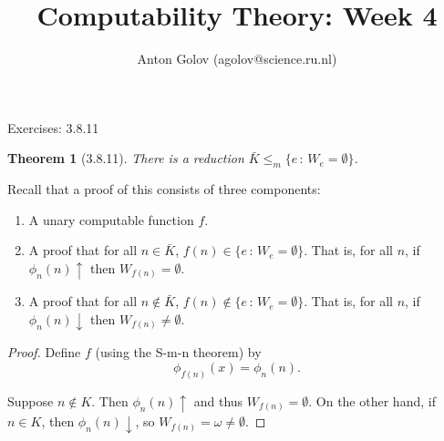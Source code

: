 \documentclass{article}
\title{Computability Theory: Week 4}
\author{Anton Golov (agolov@science.ru.nl)}
\newtheorem{theorem}{Theorem}
\newcommand{\compr}[2]{\{ #1 \,:\, #2 \}}
\newcommand{\terminates}{\!\!\downarrow}
\newcommand{\diverges}{\!\!\uparrow}
\begin{document}
  \maketitle

  Exercises: 3.8.11

  \begin{theorem}[3.8.11]
    There is a reduction $\bar K \le_m \compr{e}{W_e = \emptyset}$.
  \end{theorem}

  Recall that a proof of this consists of three components:
  \begin{enumerate}
    \item A unary computable function $f$.
    \item A proof that for all $n \in \bar K$, $f(n) \in \compr{e}{W_e = \emptyset}$.  That is, for all $n$, if
    $\phi_n(n)\diverges$ then $W_{f(n)} = \emptyset$.
    \item A proof that for all $n \not \in \bar K$, $f(n) \not \in \compr{e}{W_e = \emptyset}$.  That is, for all $n$,
      if $\phi_n(n)\terminates$ then $W_{f(n)} \neq \emptyset$.
  \end{enumerate}

  \begin{proof}
    Define $f$ (using the S-m-n theorem) by
    \[
      \phi_{f(n)}(x) = \phi_n(n).
    \]

    Suppose $n \not \in K$.  Then $\phi_n(n)\diverges$ and thus $W_{f(n)} = \emptyset$.  On the other hand, if $n \in
    K$, then $\phi_n(n)\terminates$, so $W_{f(n)} = \omega \neq \emptyset$.
  \end{proof}
\end{document}
